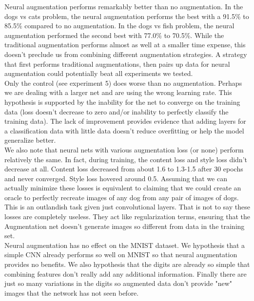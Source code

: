 \documentclass[10pt,twocolumn,letterpaper]{article}
\begin{document}
Neural augmentation performs remarkably better than no augmentation. In the dogs vs cats problem, the neural augmentation performs the best with a 91.5\% to 85.5\% compared to no augmentation. In the dogs vs fish problem, the neural augmentation performed the second best with 77.0\% to 70.5\%. While the traditional augmentation performs almost as well at a smaller time expense, this doesn't preclude us from combining different augmentation strategies. A strategy that first performs traditional augmentations, then pairs up data for neural augmentation could potentially beat all experiments we tested. \\

Only the control (see experiment 5) does worse than no augmentation. Perhaps we are dealing with a larger net and are using the wrong learning rate. This hypothesis is supported by the inability for the net to converge on the training data (loss doesn't decrease to zero and/or inability to perfectly classify the training data). The lack of improvement provides evidence that adding layers for a classification data with little data doesn't reduce overfitting or help the model generalize better. \\

We also note that neural nets with various augmentation loss (or none) perform relatively the same. In fact, during training, the content loss and style loss didn't decrease at all. Content loss decreased from about 1.6 to 1.3-1.5 after 30 epochs and never converged. Style loss hovered around 0.5. Assuming that we can actually minimize these losses is equivalent to claiming that we could create an oracle to perfectly recreate images of any dog from any pair of images of dogs. This is an outlandish task given just convolutional layers. That is not to say these losses are completely useless. They act like regularization terms, ensuring that the Augmentation net doesn't generate images so different from data in the training set. \\

Neural augmentation has no effect on the MNIST dataset. We hypothesis that a simple CNN already performs so well on MNIST so that neural augmentation provides no benefits. We also hypothesis that the digits are already so simple that combining features don't really add any additional information. Finally there are just so many variations in the digits so augmented data don't provide "new" images that the network has not seen before.\\
\end{document}
